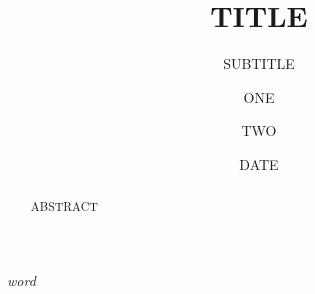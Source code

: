 \documentclass{book}
\title{TITLE}
\subtitle{SUBTITLE}
\author{ONE \and TWO}
\date{DATE}
\begin{document}
\maketitle

\begin{abstract}
ABSTRACT
\end{abstract}

\tableofcontents

\textit{word}\par
\end{document}
